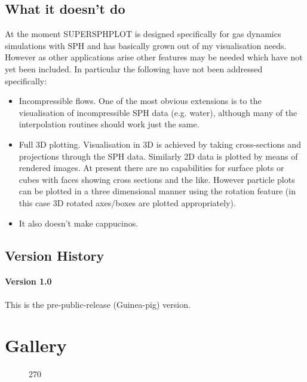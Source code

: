 \documentclass[a4paper,12pt]{article}
\begin{document}
\subsection{What it doesn't do}
At the moment SUPERSPHPLOT is designed specifically for gas dynamics
simulations with SPH and has basically grown out of my visualisation needs.
However as other applications arise other features may be needed which have not
yet been included. In particular the following have not been addressed
specifically:
\begin{itemize}
\item Incompressible flows.   One of the most obvious extensions is to the visualisation
of incompressible SPH data (e.g. water), although many of the interpolation routines should work just the same. 
\item Full 3D plotting. Visualisation in 3D is achieved by taking cross-sections
and projections through the SPH data. Similarly 2D data is plotted by means of
rendered images. At present there are no capabilities for surface plots or cubes
with faces showing cross sections and the like. However
particle plots can be plotted in a three dimensional manner using the rotation
feature (in this case 3D rotated axes/boxes are plotted appropriately).
\item It also doesn't make cappucinos.
\end{itemize}

\subsection{Version History}

\paragraph{Version 1.0}
 This is the pre-public-release (Guinea-pig) version.

\section{Gallery}

\begin{figure}
\begin{center}
\begin{turn}{270}\end{turn}
\label{fig:hyperbolic}
\end{center}
\end{figure}
\end{document}
